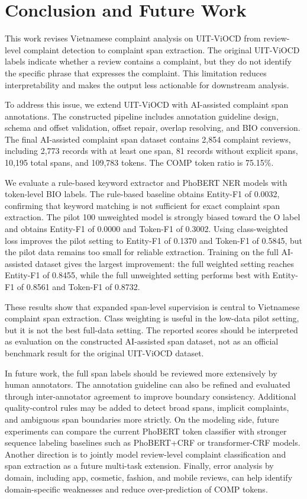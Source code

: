\documentclass[11pt]{article}
\begin{document}
\section{Conclusion and Future Work}

This work revises Vietnamese complaint analysis on UIT-ViOCD from review-level complaint detection to complaint span extraction. The original UIT-ViOCD labels indicate whether a review contains a complaint, but they do not identify the specific phrase that expresses the complaint. This limitation reduces interpretability and makes the output less actionable for downstream analysis.

To address this issue, we extend UIT-ViOCD with AI-assisted complaint span annotations. The constructed pipeline includes annotation guideline design, schema and offset validation, offset repair, overlap resolving, and BIO conversion. The final AI-assisted complaint span dataset contains 2,854 complaint reviews, including 2,773 records with at least one span, 81 records without explicit spans, 10,195 total spans, and 109,783 tokens. The COMP token ratio is 75.15\%.

We evaluate a rule-based keyword extractor and PhoBERT NER models with token-level BIO labels. The rule-based baseline obtains Entity-F1 of 0.0032, confirming that keyword matching is not sufficient for exact complaint span extraction. The pilot 100 unweighted model is strongly biased toward the O label and obtains Entity-F1 of 0.0000 and Token-F1 of 0.3002. Using class-weighted loss improves the pilot setting to Entity-F1 of 0.1370 and Token-F1 of 0.5845, but the pilot data remains too small for reliable extraction.
Training on the full AI-assisted dataset gives the largest improvement: the full weighted setting reaches Entity-F1 of 0.8455, while the full unweighted setting performs best with Entity-F1 of 0.8561 and Token-F1 of 0.8732.

These results show that expanded span-level supervision is central to Vietnamese complaint span extraction. Class weighting is useful in the low-data pilot setting, but it is not the best full-data setting. The reported scores should be interpreted as evaluation on the constructed AI-assisted span dataset, not as an official benchmark result for the original UIT-ViOCD dataset.

In future work, the full span labels should be reviewed more extensively by human annotators. The annotation guideline can also be refined and evaluated through inter-annotator agreement to improve boundary consistency. Additional quality-control rules may be added to detect broad spans, implicit complaints, and ambiguous span boundaries more strictly. On the modeling side, future experiments can compare the current PhoBERT token classifier with stronger sequence labeling baselines such as PhoBERT+CRF or transformer-CRF models. Another direction is to jointly model review-level complaint classification and span extraction as a future multi-task extension. Finally, error analysis by domain, including app, cosmetic, fashion, and mobile reviews, can help identify domain-specific weaknesses and reduce over-prediction of COMP tokens.
\end{document}
